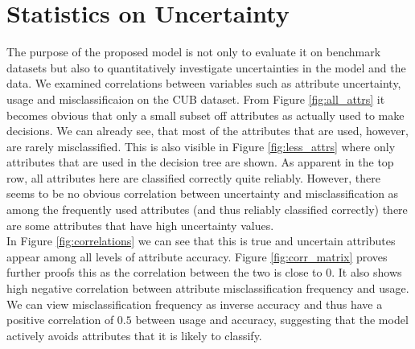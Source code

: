 \documentclass[a4paper,cleardoubleempty,BCOR1cm, 11pt]{report}
\begin{document}
\section{Statistics on Uncertainty}
The purpose of the proposed model is not only to evaluate it on benchmark datasets but also to quantitatively investigate uncertainties in the model and the data. We examined correlations between variables such as attribute uncertainty, usage and misclassificaion on the CUB dataset. From Figure \ref{fig:all_attrs} it becomes obvious that only a small subset off attributes as actually used to make decisions. We can already see, that most of the attributes that are used, however, are rarely misclassified. This is also visible in Figure \ref{fig:less_attrs} where only attributes that are used in the decision tree are shown. As apparent in the top row, all attributes here are classified correctly quite reliably. However, there seems to be no obvious correlation between uncertainty and misclassification as among the frequently used attributes (and thus reliably classified correctly) there are some attributes that have high uncertainty values.\\
In Figure \ref{fig:correlations} we can see that this is true and uncertain attributes appear among all levels of attribute accuracy. Figure \ref{fig:corr_matrix} proves further proofs this as the correlation between the two is close to $0$. It also shows high negative correlation between attribute misclassification frequency and usage. We can view misclassification frequency as inverse accuracy and thus have a positive correlation of $0.5$ between usage and accuracy, suggesting that the model actively avoids attributes that it is likely to classify.
\end{document}
